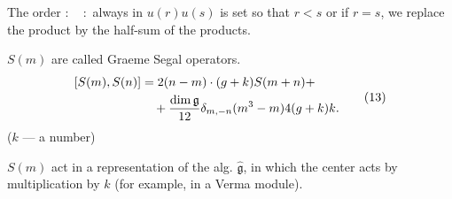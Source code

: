 The order \({:}\quad{:}\) always in \(u(r)u(s)\) is set so that
\(r<s\) or if \(r=s\), we replace the product by the half-sum of the products.

\(S(m)\) are called Graeme Segal operators.
\begin{equation*}
\begin{aligned}
\relax [S(m),S(n)]&=2(n-m)\cdot(g+k)S(m+n)+\\
&\quad+\frac{\dim\mathfrak g}{12}\delta_{m,-n}(m^3-m)4(g+k)k.
\end{aligned}\tag{13}
\end{equation*}
(\(k\) --- a number)

\(S(m)\) act in a representation of the alg. \(\widehat{\mathfrak g}\), in which the center acts by multiplication by \(k\) (for example, in a Verma module).


